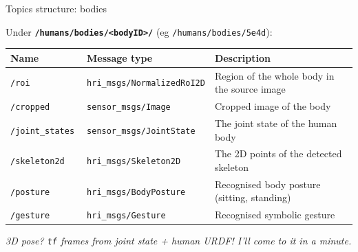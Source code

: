 \documentclass[xcolor=table,aspectratio=169]{beamer}
\begin{document}
\begin{frame}{Topics structure: bodies}

    Under \textbf{\texttt{/humans/bodies/<bodyID>/}} (eg \texttt{/humans/bodies/5e4d}):

    \scriptsize
    \begin{tabular}{@{}p{2.5cm}p{4.5cm}p{6cm}@{}}
        \toprule
        \textbf{Name} & \textbf{Message type}         & \textbf{Description}                                                \\ \midrule
        \texttt{/roi       }   & \texttt{hri\_msgs/NormalizedRoI2D} & Region of the whole body in the source image                              \\
        \texttt{/cropped       }   & \texttt{sensor\_msgs/Image} & Cropped image of the body                              \\
        \texttt{/joint\_states       }   & \texttt{sensor\_msgs/JointState} & The joint state of the human body                              \\
        \texttt{/skeleton2d}   & \texttt{hri\_msgs/Skeleton2D}        & The 2D points of the detected skeleton                              \\
        \texttt{/posture}    & \texttt{hri\_msgs/BodyPosture}      & Recognised body posture (sitting, standing)                                 \\
        \texttt{/gesture}    & \texttt{hri\_msgs/Gesture}      & Recognised symbolic gesture                                 \\
        \bottomrule               
\end{tabular}

    \vspace{1em}
    \emph{3D pose? \texttt{tf} frames from joint state + human URDF! I'll come to it
    in a minute.}
    
\end{frame}
\end{document}
